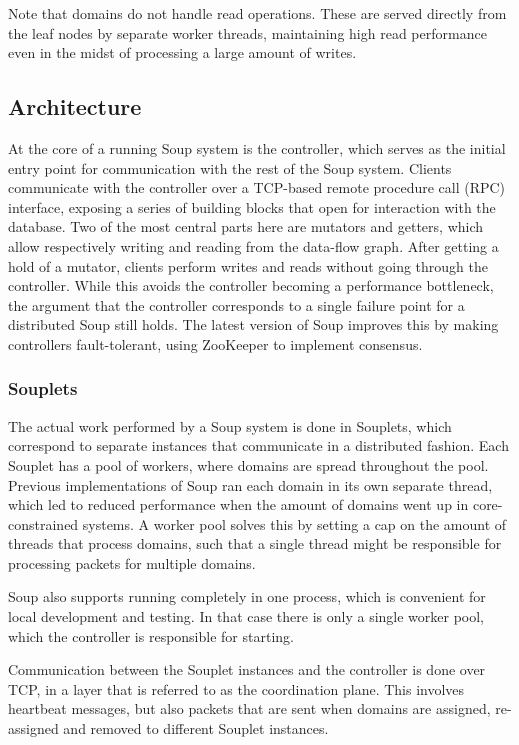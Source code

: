 \documentclass[b5paper]{report}
\begin{document}
Note that domains do not handle read operations. These are served directly from
the leaf nodes by separate worker threads, maintaining high read performance
even in the midst of processing a large amount of writes.

\subsection{Architecture}
At the core of a running Soup system is the controller, which serves as the
initial entry point for communication with the rest of the Soup system. Clients
communicate with the controller over a TCP-based remote procedure call (RPC)
interface, exposing a series of building blocks that open for interaction with
the database. Two of the most central parts here are mutators and getters, which
allow respectively writing and reading from the data-flow graph. After getting a
hold of a mutator, clients perform writes and reads without going through the
controller. While this avoids the controller becoming a performance bottleneck,
the argument that the controller corresponds to a single failure point for a
distributed Soup still holds. The latest version of Soup improves this by making
controllers fault-tolerant, using ZooKeeper \cite{zookeeper} to implement
consensus.

\subsubsection{Souplets}
The actual work performed by a Soup system is done in Souplets, which
correspond to separate instances that communicate in a distributed fashion. Each
Souplet has a pool of workers, where domains are spread throughout the pool.
Previous implementations of Soup ran each domain in its own separate thread,
which led to reduced performance when the amount of domains went up in
core-constrained systems. A worker pool solves this by setting a cap on the
amount of threads that process domains, such that a single thread might be
responsible for processing packets for multiple domains.

Soup also supports running completely in one process, which is convenient for
local development and testing. In that case there is only a single worker pool,
which the controller is responsible for starting.

Communication between the Souplet instances and the controller is done over TCP,
in a layer that is referred to as the coordination plane. This involves
heartbeat messages, but also packets that are sent when domains are assigned,
re-assigned and removed to different Souplet instances.
\end{document}
